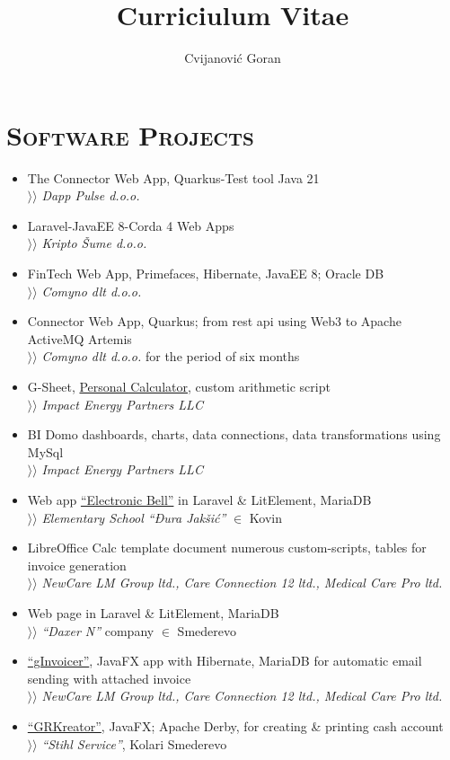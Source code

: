 \documentclass[12pt]{article}
\author{Cvijanović Goran}
\title{Curriciulum Vitae}
\begin{document}
\section{\textsc{Software Projects}}

\begin{itemize}[parsep=1.5pt]
    \item The Connector Web App, Quarkus-Test tool Java 21 \\
        $\rangle\!\rangle$ \textit{Dapp Pulse d.o.o.}
    \item Laravel-JavaEE 8-Corda 4 Web Apps \\
        $\rangle\!\rangle$ \textit{Kripto Šume d.o.o.}
    \item FinTech Web App, Primefaces, Hibernate, JavaEE 8; Oracle DB \\
        $\rangle\!\rangle$ \textit{Comyno dlt d.o.o.}
    \item Connector Web App, Quarkus; from rest api using Web3 to Apache ActiveMQ Artemis \\
        $\rangle\!\rangle$ \textit{Comyno dlt d.o.o.} for the period of six months
    \item G-Sheet, \href{https://docs.google.com/spreadsheets/d/1ztJoonmA0d0AyNDwVE1vnjpOPPpM03JF1eWCHwfQ4ZA/edit?usp=sharing}{Personal Calculator}, custom arithmetic script \\
        $\rangle\!\rangle$ \textit{Impact Energy Partners LLC}
    \item BI Domo dashboards, charts, data connections, data transformations using MySql \\
        $\rangle\!\rangle$ \textit{Impact Energy Partners LLC}
    \item Web app \href{https://zvono.nastavnikinformatike.com}{``Electronic Bell''} in Laravel \& LitElement, MariaDB \\
        $\rangle\!\rangle$ \textit{Elementary School ``Đura Jakšić''} $\in$ Kovin
    \item LibreOffice Calc template document numerous custom-scripts, tables for invoice generation \\ 
        $\rangle\!\rangle$ \textit{NewCare LM Group ltd., Care Connection 12 ltd., Medical Care Pro ltd.}
    \item Web page in Laravel \& LitElement, MariaDB \\
        $\rangle\!\rangle$ \textit{``Daxer N''} company $\in$ Smederevo
    \item \href{https://github.com/goranrsbg/gInvoicer}{``gInvoicer''}, JavaFX app with Hibernate, MariaDB for automatic email sending with attached invoice \\
        $\rangle\!\rangle$ \textit{NewCare LM Group ltd., Care Connection 12 ltd., Medical Care Pro ltd.}
    \item \href{https://github.com/goranrsbg/GRKreator}{``GRKreator''}, JavaFX; Apache Derby, for creating \& printing cash account \\
        $\rangle\!\rangle$ \textit{``Stihl Service''}, Kolari Smederevo
\end{itemize}
\end{document}

